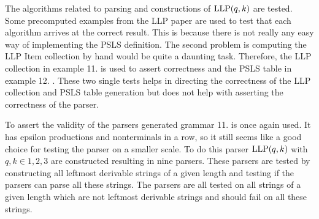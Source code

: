 The algorithms related to parsing and constructions of $\text{LLP}(q, k)$ are tested. Some precomputed examples from the LLP paper \cite{Vagner2007} are used to test that each algorithm arrives at the correct result. This is because there is not really any easy way of implementing the PSLS definition. The second problem is computing the LLP Item collection by hand would be quite a daunting task. Therefore, the LLP collection in example 11. \cite[14]{Vagner2007} is used to assert correctness and the PSLS table in example 12. \cite[14]{Vagner2007}. These two single tests helps in directing the correctness of the LLP collection and PSLS table generation but does not help with asserting the correctness of the parser.

To assert the validity of the parsers generated grammar 11. \cite[14]{Vagner2007} is once again used. It has epsilon productions and nonterminals in a row, so it still seems like a good choice for testing the parser on a smaller scale. To do this parser $\text{LLP}(q, k)$ with $q, k \in {1, 2, 3}$ are constructed resulting in nine parsers. These parsers are tested by constructing all leftmost derivable strings of a given length and testing if the parsers can parse all these strings. The parsers are all tested on all strings of a given length which are not leftmost derivable strings and should fail on all these strings.